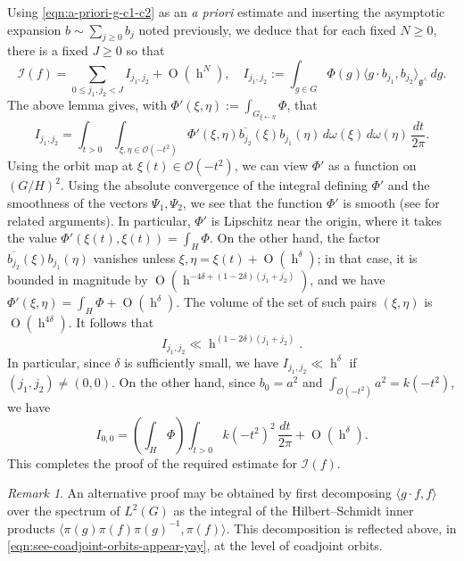\documentclass[reqno,10pt]{amsart}
\theoremstyle{plain} %
\theoremstyle{definition}
\theoremstyle{plain} %
\theoremstyle{remark}
\newtheorem*{remark*}            {Remark}
\theoremstyle{itplain} %
\theoremstyle{remark} %
\renewcommand{\geq}{\geqslant}
\renewcommand{\leq}{\leqslant}
\numberwithin{equation}{section}
\def\O{\operatorname{O}}
\DeclareMathOperator{\h}{h}
\begin{document}
Using \eqref{eqn:a-priori-g-c1-c2} as an \emph{a priori} estimate and inserting the asymptotic expansion $b \sim \sum_{j \geq 0} b_j$ noted previously, we deduce that for each fixed $N \geq 0$, there is a fixed $J \geq 0$ so that
\begin{equation*}
  \mathcal{I}(f) = \sum_{0 \leq j_1,j_2 < J} I_{j_1,j_2} + \O(\h^N), \quad I_{j_1,j_2} := \int_{g \in G} \Phi(g) \langle g \cdot b_{j_1}, b_{j_2} \rangle_{\mathfrak{g}^\wedge} \,d g .
\end{equation*}
The above lemma gives, with $\Phi'(\xi,\eta) := \int_{G_{\xi \leftarrow \eta}} \Phi$, that
\begin{equation}\label{eqn:see-coadjoint-orbits-appear-yay}
  I_{j_1,j_2}
  =
  \int_{t > 0}
  \int_{\xi, \eta \in \mathcal{O}(-t^2)}
  \Phi'(\xi,\eta)
  \overline{b_{j_2}}(\xi) 
  b_{j_1}(\eta)
  \, d \omega (\xi ) \, d \omega (\eta )
  \, \frac{d t}{2 \pi}.
\end{equation}
Using the orbit map at $\xi(t) \in \mathcal{O}(-t^2)$, we can view $\Phi'$ as a function on $(G/H)^2$.  Using the absolute convergence of the integral defining $\Phi'$ and the smoothness of the vectors $\Psi_1, \Psi_2$, we see that the function $\Phi'$ is smooth (see \cite[\S18]{nelson-venkatesh-1} for related arguments).  In particular, $\Phi'$ is Lipschitz near the origin, where it takes the value $\Phi'(\xi(t),\xi(t)) = \int_H \Phi$.  On the other hand, the factor $\overline{b_{j_2}}(\xi) b_{j_1}(\eta)$ vanishes unless $\xi,\eta = \xi(t) + \O(\h^\delta)$; in that case, it is bounded in magnitude by $\O(\h^{-4\delta + (1 - 2 \delta)(j_1 + j_2)})$, and we have $\Phi'(\xi,\eta) = \int_H \Phi + \O(\h^\delta)$.  The volume of the set of such pairs $(\xi,\eta)$ is $\O(\h^{4 \delta})$.  It follows that
\[
  I_{j_1,j_2} \ll \h^{(1 - 2 \delta) (j_1 + j_2)}.
\]
In particular, since $\delta$ is sufficiently small, we have $I_{j_1,j_2} \ll \h^\delta$ if $(j_1,j_2) \neq (0,0)$.  On the other hand, since $b_0 = a^2$ and $\int_{\mathcal{O}(-t^2)} a^2 = k(-t^2)$, we have
\begin{equation*}
  I_{0,0} = \left(\int_H \Phi\right) \int_{t > 0} k(-t^2)^2 \, \frac{d t}{2 \pi} + \O(\h^{\delta}).
\end{equation*}
This completes the proof of the required estimate for $\mathcal{I}(f)$.

\begin{remark*}
  An alternative proof may be obtained by first decomposing $\langle g \cdot f, f \rangle$ over the spectrum of $L^2(G)$ as the integral of the Hilbert--Schmidt inner products $\langle \pi(g) \pi(f) \pi(g)^{-1}, \pi(f) \rangle$.  This decomposition is reflected above, in \eqref{eqn:see-coadjoint-orbits-appear-yay}, at the level of coadjoint orbits.
\end{remark*}
\end{document}
